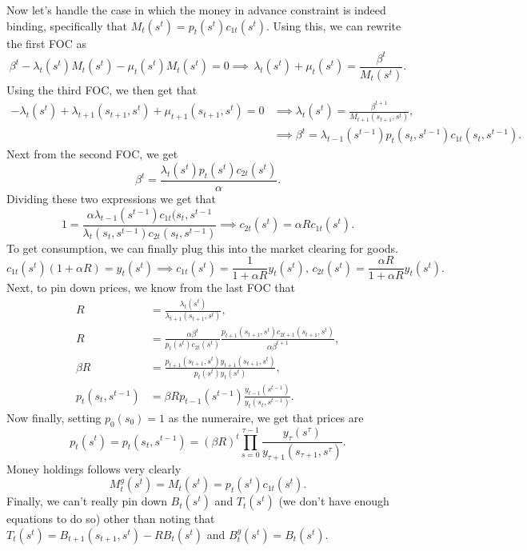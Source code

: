 \documentclass[11pt,english]{article}
\begin{document}
\begin{enumerate}[label = (\alph*)]
\begin{solution}
Now let's handle the case in which the money in advance constraint is indeed binding, specifically that $M_t(s^t) = p_t(s^t)c_{1t}(s^t)$. Using this, we can rewrite the first FOC as $$\beta^t - \lambda_{t}(s^t) M_t(s^t) - \mu_{t}(s^t)M_t(s^t) = 0 \implies \,\lambda_t(s^t) + \mu_t(s^t) = \frac{\beta^t}{M_t(s^t)}.$$ 
Using the third FOC, we then get that \begin{align*}-\lambda_t(s^t) +  \lambda_{t+1}(s_{t+1},s^t) + \mu_{t+1}(s_{t+1},s^t) = 0 &\implies \lambda_{t}(s^{t}) = \frac{\beta^{t+1}}{M_{t+1}(s_{t+1},s^t)},\\ 
&\implies \beta^{t} = \lambda_{t-1}(s^{t-1}) p_t(s_{t},s^{t-1}) c_{1t}(s_{t},s^{t-1}).\end{align*}
Next from the second FOC, we get $$\beta^t = \frac{\lambda_t(s^t) p_t(s^t) c_{2t}(s^t)}{\alpha}.$$
Dividing these two expressions we get that $$1 = \frac{\alpha \lambda_{t-1}(s^{t-1})c_{1t}(s_t, s^{t-1}}{\lambda_t(s_t, s^{t-1})c_{2t}(s_t, s^{t-1})} \implies c_{2t}(s^t) = \alpha R c_{1t}(s^t).$$ To get consumption, we can finally plug this into the market clearing for goods. 
$$c_{1t}(s^t)\left(1 + \alpha R\right) = y_t(s^t) \implies \boxed{c_{1t}(s^t) = \frac{1}{1 + \alpha R}y_t(s^t),\, c_{2t}(s^t) = \frac{\alpha R}{1 + \alpha R}y_t(s^t).}$$
Next, to pin down prices, we know from the last FOC that 
\begin{align*}
R &= \frac{\lambda_{t}(s^t)}{\lambda_{t+1}(s_{t+1}, s^t)},\\
R &= \frac{\alpha \beta^t}{p_t(s^t)c_{2t}(s^t)}\frac{p_{t+1}(s_{t+1},s^t)c_{2t+1}(s_{t+1}, s^t)}{\alpha \beta^{t+1}},\\
\beta R &= \frac{p_{t+1}(s_{t+1},s^t) y_{t+1}(s_{t+1}, s^t)}{p_t(s^t)y_{t}(s^t)},\\
p_{t}(s_{t},s^{t-1}) &= \beta R p_{t-1}(s^{t-1})\frac{y_{t-1}(s^{t-1})}{y_{t}(s_{t}, s^{t-1})}.
\end{align*} Now finally, setting $p_0(s_0) = 1$ as the numeraire, we get that prices are $$\boxed{p_t(s^t) = p_t(s_{t},s^{t-1}) = (\beta R)^t\prod_{s=0}^{\tau-1}\frac{y_{\tau}(s^\tau)}{y_{\tau+1}(s_{\tau+1}, s^\tau)}.}$$ Money holdings follows very clearly $$\boxed{M_t^g(s^{t}) = M_t(s^{t}) = p_t(s^{t})c_{1t}(s^t).}$$
Finally, we can't really pin down $B_t(s^{t})$ and $T_t(s^{t})$ (we don't have enough equations to do so) other than noting that $T_t(s^t) = B_{t+1}(s_{t+1}, s^t) - RB_t(s^t)$ and $B_t^g(s^t) = B_t(s^t)$.


\end{solution}
\end{enumerate}
\end{document}
